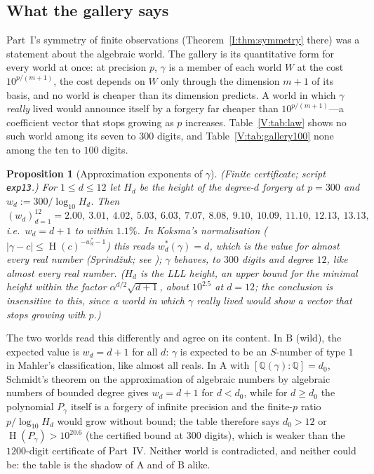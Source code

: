 \documentclass[11pt,a4paper]{article}
\newcommand{\Q}{\mathbb Q}
\DeclareMathOperator{\Ht}{H}
\newtheorem{proposition}[theorem]{Proposition}
\theoremstyle{definition}
\theoremstyle{remark}
\numberwithin{equation}{section}
\begin{document}
\subsection{What the gallery says}

Part~I's symmetry of finite observations (Theorem~\ref{I:thm:symmetry} there) was a statement about the
algebraic world. The gallery is its quantitative form for every world at once: at
precision $p$, $\gamma$ is a member of each world $W$ at the cost $10^{p/(m+1)}$, the cost
depends on $W$ only through the dimension $m+1$ of its basis, and no world is cheaper than
its dimension predicts. A world in which $\gamma$ \emph{really} lived would announce itself
by a forgery far cheaper than $10^{p/(m+1)}$---a coefficient vector that stops growing as
$p$ increases. Table~\ref{V:tab:law} shows no such world among its seven to $300$ digits,
and Table~\ref{V:tab:gallery100} none among the ten to $100$ digits.

\begin{proposition}[Approximation exponents of $\gamma$]\label{V:prop:wirsing}
\textup{(Finite certificate; script \texttt{exp13}.)} For $1\le d\le12$ let $H_d$ be the
height of the degree-$d$ forgery at $p=300$ and $w_d:=300/\log_{10}H_d$. Then
\[
 (w_d)_{d=1}^{12}=2.00,\ 3.01,\ 4.02,\ 5.03,\ 6.03,\ 7.07,\ 8.08,\ 9.10,\ 10.09,\ 11.10,\ 12.13,\ 13.13 ,
\]
i.e.\ $w_d=d+1$ to within $1.1\%$. In Koksma's normalisation ($|\gamma-c|\le\Ht(c)^{-w^*_d-1}$)
this reads $w_d^*(\gamma)=d$, which is the value for almost every real number
(Sprind\v zuk; see \cite{Bugeaud}); $\gamma$ behaves, to $300$ digits and degree $12$,
like almost every real number. ($H_d$ is the LLL height, an upper bound for the minimal
height within the factor $\alpha^{d/2}\sqrt{d+1}$, about $10^{2.5}$ at $d=12$; the
conclusion is insensitive to this, since a world in which $\gamma$ really lived would show
a vector that stops growing with $p$.)
\end{proposition}

The two worlds read this differently and agree on its content. In $\mathrm B$ (wild), the
expected value is $w_d=d+1$ for all $d$: $\gamma$ is expected to be an $S$-number of type $1$
in Mahler's classification, like almost all reals. In $\mathrm A$ with $[\Q(\gamma):\Q]=d_0$,
Schmidt's theorem on the approximation of algebraic numbers by algebraic numbers of bounded
degree \cite{Schmidt1971} gives $w_d=d+1$ for $d<d_0$, while for $d\ge d_0$ the polynomial
$P_\gamma$ itself is a forgery of infinite precision and the finite-$p$ ratio
$p/\log_{10}H_d$ would grow without bound; the table therefore says $d_0>12$ or
$\Ht(P_\gamma)>10^{20.6}$ (the certified bound at $300$ digits), which is weaker than the
$1200$-digit certificate of Part~IV. Neither world is contradicted, and neither could be:
the table is the shadow of $\mathrm A$ and of $\mathrm B$ alike.
\end{document}
